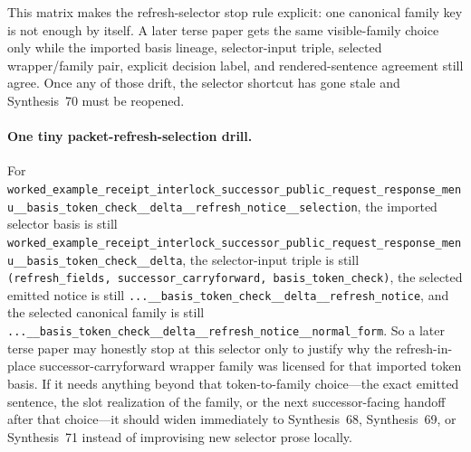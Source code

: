 \documentclass[11pt]{article}
\begin{document}
This matrix makes the refresh-selector stop rule explicit: one canonical family key is not enough by itself. A later terse paper gets the same visible-family choice only while the imported basis lineage, selector-input triple, selected wrapper/family pair, explicit decision label, and rendered-sentence agreement still agree. Once any of those drift, the selector shortcut has gone stale and Synthesis~70 must be reopened.\cite{series:workedexample}

\paragraph{One tiny packet-refresh-selection drill.}
For \nolinkurl{worked_example_receipt_interlock_successor_public_request_response_menu__basis_token_check__delta__refresh_notice__selection}, the imported selector basis is still \nolinkurl{worked_example_receipt_interlock_successor_public_request_response_menu__basis_token_check__delta}, the selector-input triple is still \nolinkurl{(refresh_fields, successor_carryforward, basis_token_check)}, the selected emitted notice is still \nolinkurl{...__basis_token_check__delta__refresh_notice}, and the selected canonical family is still \nolinkurl{...__basis_token_check__delta__refresh_notice__normal_form}. So a later terse paper may honestly stop at this selector only to justify why the refresh-in-place successor-carryforward wrapper family was licensed for that imported token basis. If it needs anything beyond that token-to-family choice---the exact emitted sentence, the slot realization of the family, or the next successor-facing handoff after that choice---it should widen immediately to Synthesis~68, Synthesis~69, or Synthesis~71 instead of improvising new selector prose locally.\cite{series:workedexample}
\end{document}

